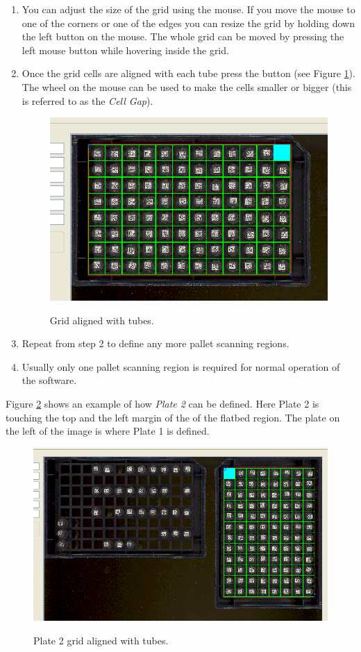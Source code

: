 \begin{enumerate}
  \item You can adjust the size of the grid using the mouse. If you move the
    mouse to one of the corners or one of the edges you can resize the grid by
    holding down the left button on the mouse. The whole grid can be moved by
    pressing the left mouse button while hovering inside the grid.
    \clearpage
  \item Once the grid cells are aligned with each tube press the  button
    (see Figure \ref{fig:plate1_grid_ready}). The wheel on the mouse can be
    used to make the cells smaller or bigger (this is referred to as the
    \emph{Cell Gap}).
    \begin{figure}[H]
      \centering
      \scalebox{0.5}
      { \includegraphics*{screenshots/configuration/plate1_grid_ready} }
      \caption{Grid aligned with tubes.}
      \label{fig:plate1_grid_ready}
    \end{figure}
  \item Repeat from step 2 to define any more pallet scanning regions.
  \item Usually only one pallet scanning region is required for normal
    operation of the software.
\end{enumerate}
Figure \ref{fig:plate2_grid_ready} shows an example of how \emph{Plate 2} can
be defined. Here Plate 2 is touching the top and the left margin of
the of the flatbed region. The plate on the left of the image is where Plate 1
is defined.
    \begin{figure}[H]
      \centering
      \scalebox{0.5}
      { \includegraphics*{screenshots/configuration/plate2_grid_ready} }
      \caption{Plate 2 grid aligned with tubes.}
      \label{fig:plate2_grid_ready}
    \end{figure}
